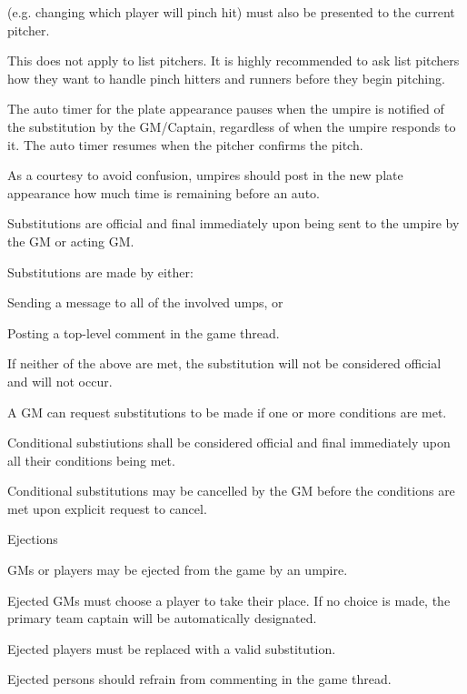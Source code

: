 \begin{deepEnumerate}
\begin{deepEnumerate}
\begin{deepEnumerate}
			(e.g. changing which player will pinch hit) must also be presented to the current pitcher.
			\item This does not apply to list pitchers. It is highly recommended to ask list pitchers how they want to handle pinch hitters and runners before they begin pitching.
			\item The auto timer for the plate appearance pauses when the umpire is notified of the substitution by the GM/Captain, 
			regardless of when the umpire responds to it. The auto timer resumes when the pitcher confirms the pitch.
			\begin{deepEnumerate}
				\item As a courtesy to avoid confusion, umpires should post in the new plate appearance how much time is remaining before an auto.
			\end{deepEnumerate}
		\end{deepEnumerate}
		\item Substitutions are official and final immediately upon being sent to the umpire by the GM or acting GM.
		\begin{deepEnumerate}
			\item Substitutions are made by either:
			\begin{deepEnumerate}
				\item Sending a message to all of the involved umps, or 
				\item Posting a top-level comment in the game thread.
			\end{deepEnumerate}
			\item If neither of the above are met, the substitution will not be considered official and will not occur.
			\item A GM can request substitutions to be made if one or more conditions are met.
			\begin{deepEnumerate}
				\item Conditional substiutions shall be considered official and final immediately upon all their conditions being met. 
				\item Conditional substitutions may be cancelled by the GM before the conditions are met upon explicit request to cancel.
			\end{deepEnumerate}
		\end{deepEnumerate}
	\end{deepEnumerate}
	\item Ejections
	\begin{deepEnumerate}
		\item GMs or players may be ejected from the game by an umpire.
		\begin{deepEnumerate}
			\item Ejected GMs must choose a player to take their place. If no choice is made, the primary team captain will be automatically designated.
			\item Ejected players must be replaced with a valid substitution.
			\item Ejected persons should refrain from commenting in the game thread.
		\end{deepEnumerate}
	\end{deepEnumerate}
\end{deepEnumerate}
